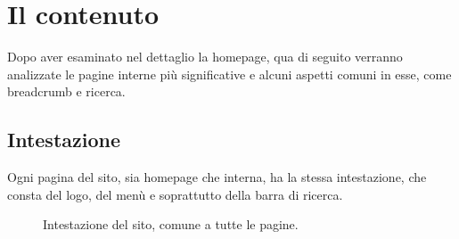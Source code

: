\section{Il contenuto}
Dopo aver esaminato nel dettaglio la homepage, qua di seguito verranno analizzate le pagine interne più significative e alcuni aspetti comuni in esse, come breadcrumb e ricerca. 

\subsection{Intestazione}
Ogni pagina del sito, sia homepage che interna, ha la stessa intestazione, che consta del logo, del menù e soprattutto della barra di ricerca.
\begin{figure}[!htb]
	\caption{\label{fig:figura5}} Intestazione del sito, comune a tutte le pagine.
\end{figure}


